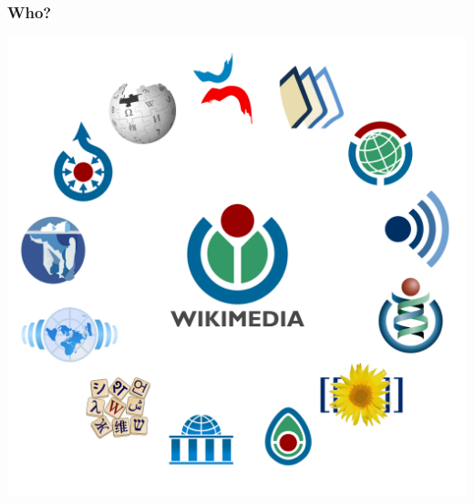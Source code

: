 \documentclass{beamer}
\begin{document}
\begin{frame}
  \frametitle{Who?}
  \begin{center}
    \includegraphics[height = 0.8\textheight, keepaspectratio = true]{figure/wiki_family}
  \end{center}
\end{frame}
\end{document}
